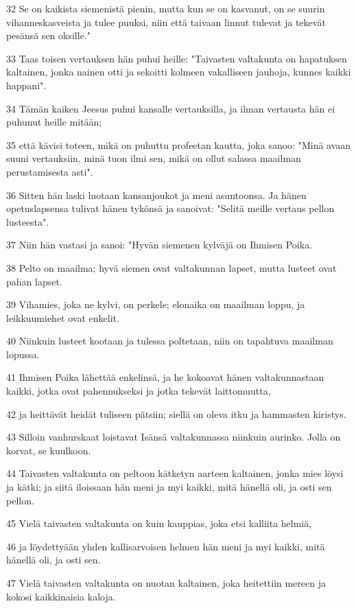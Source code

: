\par 32 Se on kaikista siemenistä pienin, mutta kun se on kasvanut, on se suurin vihanneskasveista ja tulee puuksi, niin että taivaan linnut tulevat ja tekevät pesänsä sen oksille."
\par 33 Taas toisen vertauksen hän puhui heille: "Taivasten valtakunta on hapatuksen kaltainen, jonka nainen otti ja sekoitti kolmeen vakalliseen jauhoja, kunnes kaikki happani".
\par 34 Tämän kaiken Jeesus puhui kansalle vertauksilla, ja ilman vertausta hän ei puhunut heille mitään;
\par 35 että kävisi toteen, mikä on puhuttu profeetan kautta, joka sanoo: "Minä avaan suuni vertauksiin, minä tuon ilmi sen, mikä on ollut salassa maailman perustamisesta asti".
\par 36 Sitten hän laski luotaan kansanjoukot ja meni asuntoonsa. Ja hänen opetuslapsensa tulivat hänen tykönsä ja sanoivat: "Selitä meille vertaus pellon lusteesta".
\par 37 Niin hän vastasi ja sanoi: "Hyvän siemenen kylväjä on Ihmisen Poika.
\par 38 Pelto on maailma; hyvä siemen ovat valtakunnan lapset, mutta lusteet ovat pahan lapset.
\par 39 Vihamies, joka ne kylvi, on perkele; elonaika on maailman loppu, ja leikkuumiehet ovat enkelit.
\par 40 Niinkuin lusteet kootaan ja tulessa poltetaan, niin on tapahtuva maailman lopussa.
\par 41 Ihmisen Poika lähettää enkelinsä, ja he kokoavat hänen valtakunnastaan kaikki, jotka ovat pahennukseksi ja jotka tekevät laittomuutta,
\par 42 ja heittävät heidät tuliseen pätsiin; siellä on oleva itku ja hammasten kiristys.
\par 43 Silloin vanhurskaat loistavat Isänsä valtakunnassa niinkuin aurinko. Jolla on korvat, se kuulkoon.
\par 44 Taivasten valtakunta on peltoon kätketyn aarteen kaltainen, jonka mies löysi ja kätki; ja siitä iloissaan hän meni ja myi kaikki, mitä hänellä oli, ja osti sen pellon.
\par 45 Vielä taivasten valtakunta on kuin kauppias, joka etsi kalliita helmiä,
\par 46 ja löydettyään yhden kallisarvoisen helmen hän meni ja myi kaikki, mitä hänellä oli, ja osti sen.
\par 47 Vielä taivasten valtakunta on nuotan kaltainen, joka heitettiin mereen ja kokosi kaikkinaisia kaloja.
